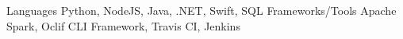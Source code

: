 
\begin{cvskills}
  \cvskill
    {Languages} %
    {Python, NodeJS, Java, .NET, Swift, SQL} %
  \cvskill
    {Frameworks/Tools} %
    {Apache Spark, Oclif CLI Framework, Travis CI, Jenkins} %
\end{cvskills}
